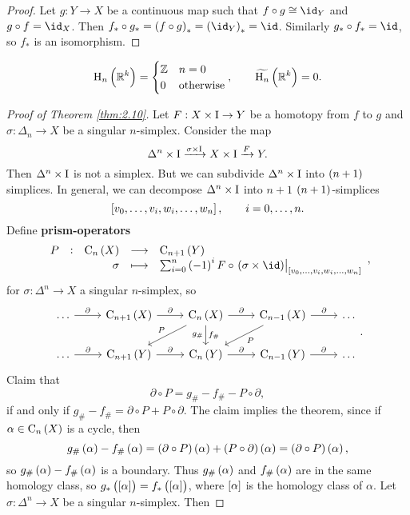 \begin{proof}
Let $ g : Y \to X $ be a continuous map such that $ f \circ g \cong \id_Y $ and $ g \circ f = \id_X $. Then $ f_* \circ g_* = \br{f \circ g}_* = \br{\id_Y}_* = \id $. Similarly $ g_* \circ f_* = \id $, so $ f_* $ is an isomorphism.
\end{proof}

\begin{example*}
$$ \H_n\br{\RR^k} =
\begin{cases}
\ZZ & n = 0 \\
0 & \text{otherwise}
\end{cases},
\qquad \widetilde{\H_n}\br{\RR^k} = 0.
$$
\end{example*}

\pagebreak

\begin{proof}[Proof of Theorem \ref{thm:2.10}]
Let $ F : X \times \mathrm{I} \to Y $ be a homotopy from $ f $ to $ g $ and $ \sigma : \Delta_n \to X $ be a singular $ n $-simplex. Consider the map
$$ \Delta^n \times \mathrm{I} \xrightarrow{\sigma \times \mathrm{I}} X \times \mathrm{I} \xrightarrow{F} Y. $$
Then $ \Delta^n \times \mathrm{I} $ is not a simplex. But we can subdivide $ \Delta^n \times \mathrm{I} $ into $ \br{n + 1} $ simplices. In general, we can decompose $ \Delta^n \times \mathrm{I} $ into $ n + 1 $ $ \br{n + 1} $-simplices
$$ \sbr{v_0, \dots, v_i, w_i, \dots, w_n}, \qquad i = 0, \dots, n. $$
Define \textbf{prism-operators}
$$ \function[P]{\C_n\br{X}}{\C_{n + 1}\br{Y}}{\sigma}{\sum_{i = 0}^n \br{-1}^iF \circ \eval{\br{\sigma \times \id}}_{\sbr{v_0, \dots, v_i, w_i, \dots, w_n}}}, $$
for $ \sigma : \Delta^n \to X $ a singular $ n $-simplex, so
$$
\begin{tikzcd}
\dots \arrow{r}{\partial} & \C_{n + 1}\br{X} \arrow{r}{\partial} & \C_n\br{X} \arrow{r}{\partial} \arrow[swap]{dl}{P} \arrow{d}{f_\#}[swap]{g_\#} & \C_{n - 1}\br{X} \arrow{r}{\partial} \arrow{dl}{P} & \dots \\
\dots \arrow{r}{\partial} & \C_{n + 1}\br{Y} \arrow{r}{\partial} & \C_n\br{Y} \arrow{r}{\partial} & \C_{n - 1}\br{Y} \arrow{r}{\partial} & \dots
\end{tikzcd}.
$$
Claim that
$$ \partial \circ P = g_\# - f_\# - P \circ \partial, $$
if and only if $ g_\# - f_\# = \partial \circ P + P \circ \partial $. The claim implies the theorem, since if $ \alpha \in \C_n\br{X} $ is a cycle, then
$$ g_\#\br{\alpha} - f_\#\br{\alpha} = \br{\partial \circ P}\br{\alpha} + \br{P \circ \partial}\br{\alpha} = \br{\partial \circ P}\br{\alpha}, $$
so $ g_\#\br{\alpha} - f_\#\br{\alpha} $ is a boundary. Thus $ g_\#\br{\alpha} $ and $ f_\#\br{\alpha} $ are in the same homology class, so $ g_*\br{\sbr{\alpha}} = f_*\br{\sbr{\alpha}} $, where $ \sbr{\alpha} $ is the homology class of $ \alpha $. Let $ \sigma : \Delta^n \to X $ be a singular $ n $-simplex. Then

\end{proof}

